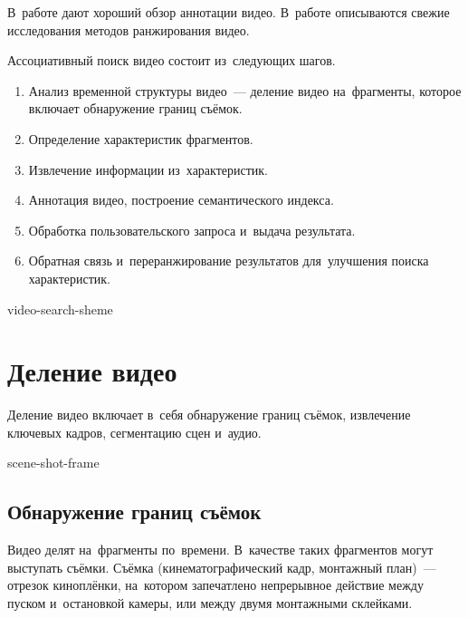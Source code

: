 В~работе \cite{Zhang:2012} дают хороший обзор аннотации видео.
В~работе \cite{XinmieTian:2011} описываются свежие исследования
методов ранжирования видео.

Ассоциативный поиск видео состоит из~следующих шагов.
\begin{enumerate}
    \item Анализ временной структуры видео~—
        деление видео на~фрагменты, которое включает обнаружение границ съёмок.
    \item Определение характеристик фрагментов.
    \item Извлечение информации из~характеристик.
    \item Аннотация видео, построение семантического индекса.
    \item Обработка пользовательского запроса и~выдача результата.
    \item Обратная связь и~переранжирование результатов для~улучшения поиска характеристик.
\end{enumerate}


\begin{figuredt}
    {video-search-sheme}
\end{figuredt}



\section{Деление видео}

Деление видео включает в~себя обнаружение границ съёмок,
извлечение ключевых кадров, сегментацию сцен и~аудио.



\begin{figuredt}
    {scene-shot-frame}
\end{figuredt}



\subsection{Обнаружение границ съёмок}

Видео делят на~фрагменты по~времени.
В~качестве таких фрагментов могут выступать съёмки.
Съёмка (кинематографический кадр,
монтажный план)~— отрезок киноплёнки,
на~котором запечатлено непрерывное действие между пуском
и~остановкой камеры, или между двумя монтажными склейками.

